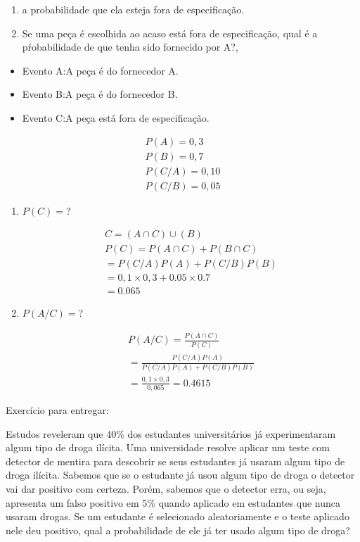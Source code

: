 \documentclass[11pt,a4paper]{article}
\begin{document}
\begin{enumerate}[label=(\alph*)]
  \item a probabilidade que ela esteja fora de especificação.
  \item Se uma peça é escolhida ao acaso está fora de especificação, qual é a 
    pŕobabilidade de que tenha sido fornecido por A?\@,
\end{enumerate}
\begin{itemize}
  \item Evento A:\@ A peça é do fornecedor A.
  \item Evento B:\@ A peça é do fornecedor B.
  \item Evento C:\@ A peça está fora de especificação.
\end{itemize}
\begin{align*}
  P(A)= 0,3\\
  P(B)=0,7\\
  P(C/A)= 0,10\\
  P(C/B)= 0,05
\end{align*}
\begin{figure}
  \label{fig:5}
\end{figure}
\begin{enumerate}[label=(\alph*)]
  \item $P(C)=$?

    \begin{align*}
      C = (A \cap C ) \cup (B)\\
      P(C) = P(A \cap C) + P( B \cap C  )\\
      =P(C/A)P(A)+P(C/B)P(B)\\
      =0,1 \times 0,3 + 0.05 \times 0.7\\
      =0.065
    \end{align*}
  \item $P(A/C)=$?

    \begin{align*}
      P(A/C)= \frac{P(A\cap C)}{P(C)}\\
      = \frac{P(C/A)P(A)}{P(C/A)P(A)+P(C/B)P(B)}\\
      =\frac{0,1 \times 0,3}{0,065}=0.4615
    \end{align*}
\end{enumerate}

Exercício para entregar:

Estudos reveleram que 40\% dos estudantes universitários
já experimentaram algum tipo de droga ilícita. Uma universidade resolve aplicar 
um teste com detector de mentira para descobrir se seus estudantes já usaram algum 
tipo de droga ilícita. Sabemos que se o estudante já usou algum tipo de droga 
o detector vai dar positivo com certeza. Porém, sabemos que o detector erra, ou 
seja, apresenta um falso positivo em 5\% quando aplicado em estudantes que nunca 
usaram drogas. Se um estudante é selecionado aleatoriamente e o teste aplicado 
nele deu positivo, qual a probabilidade de ele já ter usado algum tipo de droga?
\end{document}
